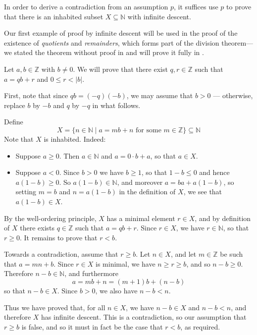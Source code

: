 \begin{strategy}
\label{strInfiniteDescent}
In order to derive a contradiction from an assumption $p$, it suffices use $p$ to prove that there is an inhabited subset $X \subseteq \mathbb{N}$ with infinite descent.
\end{strategy}

Our first example of proof by infinite descent will be used in the proof of the existence of \textit{quotients} and \textit{remainders}, which forms part of the division theorem---we stated the theorem without proof in  and will prove it fully in .

\begin{example}
\label{exQuotientRemainderExistence}
Let $a,b \in \mathbb{Z}$ with $b \ne 0$. We will prove that there exist $q,r \in \mathbb{Z}$ such that $a=qb+r$ and $0 \le r < |b|$.

First, note that since $qb = (-q)(-b)$, we may assume that $b>0$ --- otherwise, replace $b$ by $-b$ and $q$ by $-q$ in what follows.

Define
\[ X = \{ n \in \mathbb{N} \mid a = mb + n \text{ for some } m \in \mathbb{Z} \} \subseteq \mathbb{N} \]
Note that $X$ is inhabited. Indeed:
\begin{itemize}
\item Suppose $a \ge 0$. Then $a \in \mathbb{N}$ and $a = 0 \cdot b + a$, so that $a \in X$.
\item Suppose $a < 0$. Since $b>0$ we have $b \ge 1$, so that $1-b \le 0$ and hence $a(1-b) \ge 0$. So $a(1-b) \in \mathbb{N}$, and moreover $a = ba + a(1-b)$, so setting $m=b$ and $n=a(1-b)$ in the definition of $X$, we see that $a(1-b) \in X$.
\end{itemize}
By the well-ordering principle, $X$ has a minimal element $r \in X$, and by definition of $X$ there exists $q \in \mathbb{Z}$ such that $a=qb+r$. Since $r \in X$, we have $r \in \mathbb{N}$, so that $r \ge 0$. It remains to prove that $r<b$.

Towards a contradiction, assume that $r \ge b$. Let $n \in X$, and let $m \in \mathbb{Z}$ be such that $a=mn+b$. Since $r \in X$ is minimal, we have $n \ge r \ge b$, and so $n-b \ge 0$. Therefore $n-b \in \mathbb{N}$, and furthermore
\[ a = mb + n = (m+1)b + (n-b) \]
so that $n-b \in X$. Since $b>0$, we also have $n-b < n$.

Thus we have proved that, for all $n \in X$, we have $n-b \in X$ and $n-b < n$, and therefore $X$ has infinite descent. This is a contradiction, so our assumption that $r \ge b$ is false, and so it must in fact be the case that $r<b$, as required.
\end{example}

